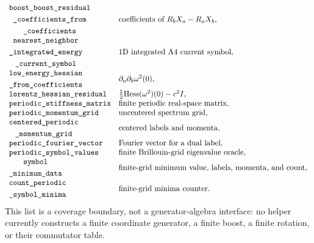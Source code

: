 \[\begin{array}{ll}
\begin{gathered}\texttt{boost\_boost\_residual}\\\texttt{\_coefficients\_from}\\\texttt{\_coefficients}\end{gathered}
  & \text{coefficients of }R_bX_a-R_aX_b,\\
\begin{gathered}\texttt{nearest\_neighbor}\\\texttt{\_integrated\_energy}\\\texttt{\_current\_symbol}\end{gathered}
  & \text{1D integrated A4 current symbol},\\
\begin{gathered}\texttt{low\_energy\_hessian}\\\texttt{\_from\_coefficients}\end{gathered}
  & \partial_a\partial_b\omega^2(0),\\
\texttt{lorentz\_hessian\_residual}
  & \frac12{\rm Hess}(\omega^2)(0)-c^2I,\\
\texttt{periodic\_stiffness\_matrix}
  & \text{finite periodic real-space matrix},\\
\texttt{periodic\_momentum\_grid}
  & \text{uncentered spectrum grid},\\
\begin{gathered}\texttt{centered\_periodic}\\\texttt{\_momentum\_grid}\end{gathered}
  & \text{centered labels and momenta},\\
\texttt{periodic\_fourier\_vector}
  & \text{Fourier vector for a dual label},\\
\texttt{periodic\_symbol\_values}
  & \text{finite Brillouin-grid eigenvalue oracle},\\
\begin{gathered}\texttt{symbol}\\\texttt{\_minimum\_data}\end{gathered}
  & \text{finite-grid minimum value, labels, momenta, and count},\\
\begin{gathered}\texttt{count\_periodic}\\\texttt{\_symbol\_minima}\end{gathered}
  & \text{finite-grid minima counter}.
\end{array}
\]
This list is a coverage boundary, not a generator-algebra interface: no helper
currently constructs a finite coordinate generator, a finite boost, a finite
rotation, or their commutator table.

